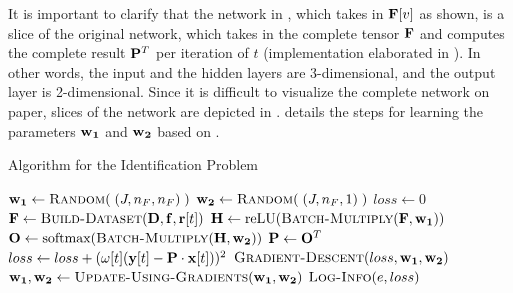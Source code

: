 It is important to clarify that the network in , which takes in $\mathbf{F}[v]$ as shown, is a slice of the original network, which takes in the complete tensor $\mathbf{F}$ and computes the complete result $\mathbf{P}^{T}$  per iteration of $t$ (implementation elaborated in ). In other words, the input and the hidden layers are 3-dimensional, and the output layer is 2-dimensional. Since it is difficult to visualize the complete network on paper, slices of the network are depicted in .  details the steps for learning the parameters $\mathbf{w_1}$ and $\mathbf{w_2}$ based on .

\begin{algorithm}[!htbp]
    \caption{Algorithm for the Identification Problem} \label{alg:Algorithm for the Identification Problem}
    \begin{algorithmic}[1]
        \State $\matr{w_1} \gets \Call{Random}{\;(J,n_F,n_F)\;}$
        \State $\matr{w_2} \gets \Call{Random}{\;(J,n_F,1)\;}$
            \State $loss \gets 0$
                \State $\tens{F} \gets \Call{Build-Dataset}{\matr{D}, \matr{f}, \matr{r}[t]}$
                \State $\matr{H} \gets  \text{reLU}(\Call{Batch-Multiply}{\tens{F}, \matr{w_1}})$
                \State $\matr{O} \gets \text{softmax}(\Call{Batch-Multiply}{\matr{H}, \matr{w_2}})$
                \State $\mathbf{P} \gets \mathbf{O}^T$
                \State $loss \gets loss + (\omega[t](\mathbf{y}[t] - \mathbf{P} \cdot \mathbf{x}[t]))^2$
            \EndFor
            \State $\Call{Gradient-Descent}{loss, \matr{w_1}, \matr{w_2}}$
            \State $\matr{w_1}, \matr{w_2} \gets \Call{Update-Using-Gradients}{\matr{w_1}, \matr{w_2}}$
            \State $\Call{Log-Info}{e, loss}$
        \EndFor
    \end{algorithmic}
\end{algorithm}

